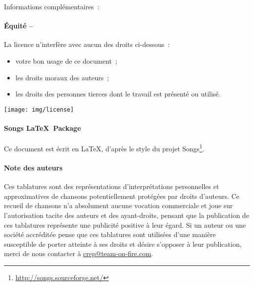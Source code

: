 {\begin{lblock}{Informations complémentaires~:}
{      \paragraph{Équité --}
      La licence n'interfère avec aucun des droits ci-dessous~:
      \begin{itemize}
      \item votre bon usage de ce document~;
      \item les droits moraux des auteurs~;
      \item les droits des personnes tierces dont le travail est
        présenté ou utilisé.
      \end{itemize}
    }

    \begin{center}
      \texttt{[image: img/license]}
    \end{center}

  \end{lblock}
  \clearpage
  \paragraph{Songs \LaTeX~Package}
  Ce document est écrit en \LaTeX, d'après le style du projet
  Songs\footnote{\url{http://songs.sourceforge.net/}}.

  \paragraph{Note des auteurs}
  Ces tablatures sont des représentations d'interprétations personnelles
  et approximatives de chansons potentiellement protégées par droits
  d'auteurs. Ce recueil de chansons n'a absolument aucune vocation
  commerciale et joue sur l'autorisation tacite des auteurs et des
  ayant-droits, pensant que la publication de ces tablatures représente
  une publicité positive à leur égard. Si un auteur ou une société
  accréditée pense que ces tablatures sont utilisées d'une manière
  susceptible de porter atteinte à ses droits et désire s'opposer à leur
  publication, merci de nous contacter à \url{crep@team-on-fire.com}.
}
